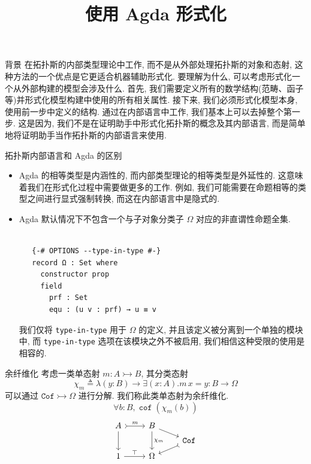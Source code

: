 \documentclass[aspectratio=169,xcolor=dvipsnames]{beamer}
\title{使用 Agda 形式化}
\date{}
\newcommand\Cof{\mathtt{Cof}}
\DeclareMathOperator\cof{\mathtt{cof}}
\begin{document}
\begin{frame}
    \titlepage
\end{frame}

\begin{frame}{背景}
  在拓扑斯的内部类型理论中工作, 而不是从外部处理拓扑斯的对象和态射, 这种方法的一个优点是它更适合机器辅助形式化. 要理解为什么, 可以考虑形式化一个从外部构建的模型会涉及什么. 首先, 我们需要定义所有的数学结构(范畴、函子等)并形式化模型构建中使用的所有相关属性. 接下来, 我们必须形式化模型本身, 使用前一步中定义的结构. 通过在内部语言中工作, 我们基本上可以去掉整个第一步. 这是因为, 我们不是在证明助手中形式化拓扑斯的概念及其内部语言, 而是简单地将证明助手当作拓扑斯的内部语言来使用.
\end{frame}

\begin{frame}{拓扑斯内部语言和 Agda 的区别}
  \begin{itemize}
  \item Agda 的相等类型是内涵性的, 而内部类型理论的相等类型是外延性的. 这意味着我们在形式化过程中需要做更多的工作. 例如, 我们可能需要在命题相等的类型之间进行显式强制转换, 而这在内部语言中是隐式的.
  \item Agda 默认情况下不包含一个与子对象分类子 $Ω$ 对应的非直谓性命题全集.
  \begin{verbatim}

   {-# OPTIONS --type-in-type #-}
   record Ω : Set where
     constructor prop
     field
       prf : Set
       equ : (u v : prf) → u ≡ v
  \end{verbatim}
  我们仅将 \verb|type-in-type| 用于 $Ω$ 的定义, 并且该定义被分离到一个单独的模块中, 而 \verb|type-in-type| 选项在该模块之外不被启用, 我们相信这种受限的使用是相容的.
\end{itemize}
\end{frame}

\begin{frame}{余纤维化}
  考虑一类单态射 $m : A\rightarrowtail B$, 其分类态射
  \[
  \chi_m \triangleq \lambda(y:B)\to\exists(x:A). m\,x = y : B \to \Omega
  \]
  可以通过 $\Cof\rightarrowtail\Omega$ 进行分解. 我们称此类单态射为余纤维化.
  \[
  \forall b:B, \cof(\chi_m(b))
  \]
  \[
  \begin{tikzcd}[row sep = tiny]
  A \arrow[r,tail, "m"] \arrow[dd] & B \arrow[dd,"{\chi_m}"] \arrow[dr] & \\
  & & \Cof \arrow[dl,tail] \\
  1 \arrow[r,"\top"] & \Omega &
  \end{tikzcd}
  \]
\end{frame}
\end{document}

